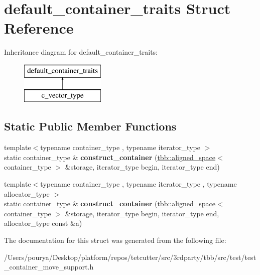 \hypertarget{structdefault__container__traits}{}\section{default\+\_\+container\+\_\+traits Struct Reference}
\label{structdefault__container__traits}
Inheritance diagram for default\+\_\+container\+\_\+traits\+:\begin{figure}[H]
\begin{center}
\leavevmode
\includegraphics[height=2.000000cm]{structdefault__container__traits}
\end{center}
\end{figure}
\subsection*{Static Public Member Functions}
\begin{DoxyCompactItemize}
\item 
\hypertarget{structdefault__container__traits_afad8a664ff789e7622f8506d83f11539}{}{\footnotesize template$<$typename container\+\_\+type , typename iterator\+\_\+type $>$ }\\static container\+\_\+type \& {\bfseries construct\+\_\+container} (\hyperlink{classtbb_1_1aligned__space}{tbb\+::aligned\+\_\+space}$<$ container\+\_\+type $>$ \&storage, iterator\+\_\+type begin, iterator\+\_\+type end)\label{structdefault__container__traits_afad8a664ff789e7622f8506d83f11539}

\item 
\hypertarget{structdefault__container__traits_af1d53ecd4c831f195380f2910a756faa}{}{\footnotesize template$<$typename container\+\_\+type , typename iterator\+\_\+type , typename allocator\+\_\+type $>$ }\\static container\+\_\+type \& {\bfseries construct\+\_\+container} (\hyperlink{classtbb_1_1aligned__space}{tbb\+::aligned\+\_\+space}$<$ container\+\_\+type $>$ \&storage, iterator\+\_\+type begin, iterator\+\_\+type end, allocator\+\_\+type const \&a)\label{structdefault__container__traits_af1d53ecd4c831f195380f2910a756faa}

\end{DoxyCompactItemize}


The documentation for this struct was generated from the following file\+:\begin{DoxyCompactItemize}
\item 
/\+Users/pourya/\+Desktop/platform/repos/tetcutter/src/3rdparty/tbb/src/test/test\+\_\+container\+\_\+move\+\_\+support.\+h\end{DoxyCompactItemize}
